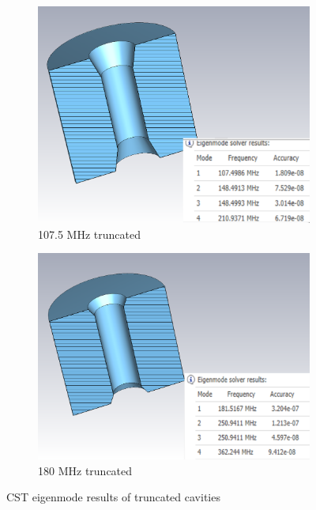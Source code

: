 \documentclass{article}
\begin{document}
\begin{figure}[H]
    \centering
    \begin{subfigure}{.5\textwidth}
      \centering
      \includegraphics[width=.9\linewidth]{../../../figures/cst/cst107mod.png}
      \caption{107.5 MHz truncated}
    \end{subfigure}%
    \begin{subfigure}{.5\textwidth}
      \centering
      \includegraphics[width=.9\linewidth]{../../../figures/cst/cst180mod.png}
      \caption{180 MHz truncated}
    \end{subfigure}
    \caption{CST eigenmode results of truncated cavities}
    \label{fig:107_180_modified_cavities_cst_eigenmode}
\end{figure}
\end{document}
